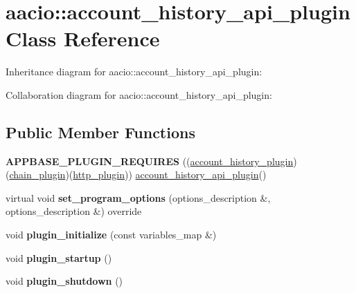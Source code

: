 \hypertarget{classaacio_1_1account__history__api__plugin}{}\section{aacio\+:\+:account\+\_\+history\+\_\+api\+\_\+plugin Class Reference}
\label{classaacio_1_1account__history__api__plugin}


Inheritance diagram for aacio\+:\+:account\+\_\+history\+\_\+api\+\_\+plugin\+:


Collaboration diagram for aacio\+:\+:account\+\_\+history\+\_\+api\+\_\+plugin\+:
\subsection*{Public Member Functions}
\begin{DoxyCompactItemize}
\item 
\mbox{\label{classaacio_1_1account__history__api__plugin_ad5c21454a77dfb90a494d65763ca2748}} 
{\bfseries A\+P\+P\+B\+A\+S\+E\+\_\+\+P\+L\+U\+G\+I\+N\+\_\+\+R\+E\+Q\+U\+I\+R\+ES} ((\mbox{\hyperlink{classaacio_1_1account__history__plugin}{account\+\_\+history\+\_\+plugin}})(\mbox{\hyperlink{classaacio_1_1chain__plugin}{chain\+\_\+plugin}})(\mbox{\hyperlink{classaacio_1_1http__plugin}{http\+\_\+plugin}})) \mbox{\hyperlink{classaacio_1_1account__history__api__plugin}{account\+\_\+history\+\_\+api\+\_\+plugin}}()
\item 
\mbox{\label{classaacio_1_1account__history__api__plugin_ad26a4401029ddbefec44544e557906b0}} 
virtual void {\bfseries set\+\_\+program\+\_\+options} (options\+\_\+description \&, options\+\_\+description \&) override
\item 
\mbox{\label{classaacio_1_1account__history__api__plugin_ac9a0661aca6adb40bdc82dc98fd67767}} 
void {\bfseries plugin\+\_\+initialize} (const variables\+\_\+map \&)
\item 
\mbox{\label{classaacio_1_1account__history__api__plugin_a8e1696006bab14eefff2fb3ffbacff48}} 
void {\bfseries plugin\+\_\+startup} ()
\item 
\mbox{\label{classaacio_1_1account__history__api__plugin_a9ef3f2361246c42dbd5744ac14aa9120}} 
void {\bfseries plugin\+\_\+shutdown} ()
\end{DoxyCompactItemize}
